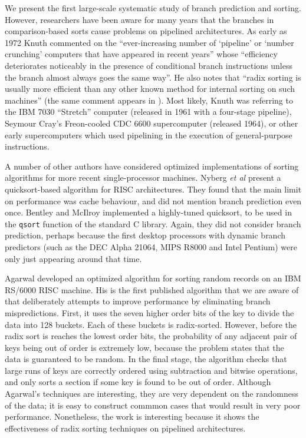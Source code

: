 \documentclass[acmtocl]{acmtrans2m}
\begin{document}
We present the first large-scale systematic study of branch prediction and
sorting. However, researchers have been aware for many years that the branches
in comparison-based sorts cause problems on pipelined architectures. As early as
1972 Knuth commented on the ``ever-increasing number of `pipeline' or `number
crunching' computers that have appeared in recent years'' whose ``efficiency
deteriorates noticeably in the presence of conditional branch instructions
unless the branch almost always goes the same way''. He also notes that ``radix
sorting is usually more efficient than any other known method for internal
sorting on such machines'' (the same comment appears in \cite{KnuthVol3_98}).
Most likely, Knuth was referring to the IBM 7030 ``Stretch'' computer (released
in 1961 with a four-stage pipeline), Seymour Cray's Freon-cooled CDC 6600
supercomputer (released 1964), or other early supercomputers which used
pipelining in the execution of general-purpose instructions.

A number of other authors have considered optimized implementations of sorting
algorithms for more recent single-processor machines. Nyberg \textit{et al}
\citeyear{Nyberg+94} present a quicksort-based algorithm for RISC architectures.
They found that the main limit on performance was cache behaviour, and did not
mention branch prediction even once. Bentley and McIlroy \citeyear{Bentley+93}
implemented a highly-tuned quicksort, to be used in the \texttt{qsort} function
of the standard C library. Again, they did not consider branch prediction,
perhaps because the first desktop processors with dynamic branch predictors
(such as the DEC Alpha 21064, MIPS R8000 and Intel Pentium) were only just
appearing around that time.

Agarwal \citeyear{Agarwal96} developed an optimized algorithm for sorting random
records on an IBM RS/6000 RISC machine. His is the first published algorithm
that we are aware of that deliberately attempts to improve performance by
eliminating branch mispredictions. First, it uses the seven higher order bits of
the key to divide the data into 128 buckets. Each of these buckets is
radix-sorted. However, before the radix sort is reaches the lowest order bits,
the probability of any adjacent pair of keys being out of order is extremely
low, because the problem states that the data is guaranteed to be random. In the
final stage, the algorithm checks that large runs of keys are correctly ordered
using subtraction and bitwise operations, and only sorts a section if some key
is found to be out of order. Although Agarwal's techniques are interesting, they
are very dependent on the randomness of the data; it is easy to construct
commmon cases that would result in very poor performance. Nonetheless, the work
is interesting because it shows the effectiveness of radix sorting techniques on
pipelined architectures.
\end{document}
